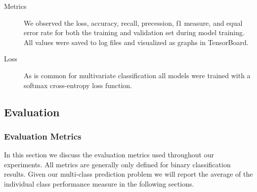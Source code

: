 \begin{description}
	\item[Metrics] We observed the loss, accuracy, recall, precession, f1 measure, and equal error rate for both the training and validation set during model training. All values were saved to log files and visualized as graphs in TensorBoard.  
	\item[Loss] As is common for multivariate classification all models were trained with a softmax cross-entropy loss function.
	\end{description}


\subsection{Evaluation} 

\subsubsection{Evaluation Metrics} 
\label{sec:metrics}
In this section we discuss the evaluation metrics used throughout our experiments. All metrics are generally only defined for binary classification results. Given our multi-class prediction problem we will report the average of the individual class performance measure in the following sections. 

